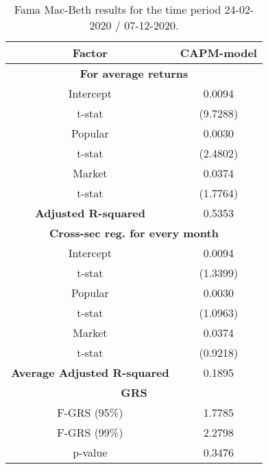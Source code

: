 \begin{table}[h!]
	\centering
	\captionsetup{skip=0.5\baselineskip}
	\caption{Fama Mac-Beth results for the time period 24-02-2020 / 07-12-2020.}
	\begin{tabular}{|c|c|}
		\hline
		\textbf{Factor} & \textbf{CAPM-model} \\ \hline
		\multicolumn{2}{|c|}{\textbf{For average returns}} \\ \hline
		Intercept & 0.0094 \\ 
		t-stat & (9.7288) \\ \hline
		Popular & 0.0030 \\ 
		t-stat & (2.4802)\\ \hline
		Market & 0.0374 \\
		t-stat & (1.7764)\\ \hline
		\textbf{Adjusted R-squared} & 0.5353 \\ \hline
		\multicolumn{2}{|c|}{\textbf{Cross-sec reg. for every month}} \\ \hline
		Intercept & 0.0094 \\ 
		t-stat & (1.3399) \\ \hline
		Popular & 0.0030 \\ 
		t-stat & (1.0963)\\ \hline
		Market & 0.0374 \\
		t-stat & (0.9218)\\ \hline
		\textbf{Average Adjusted R-squared} & 0.1895 \\ \hline
		\multicolumn{2}{|c|}{\textbf{GRS}} \\ \hline
		F-GRS (95\%) & 1.7785 \\ \hline
		F-GRS (99\%) & 2.2798 \\ \hline
		p-value & 0.3476 \\ \hline
	\end{tabular}
\end{table}

